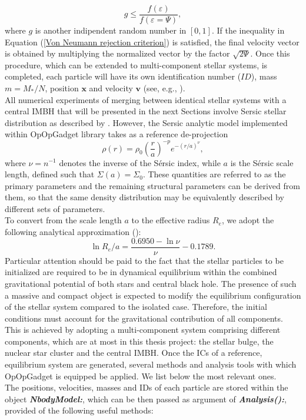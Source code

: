 \documentclass[12pt,twoside,openany]{book}
\begin{document}
\begin{equation}\label{Von Neumann rejection criterion}
 g\le \frac{f(\varepsilon)}{f(\varepsilon=\Psi)},
\end{equation}
where $g$ is another indipendent random number in $[0,1]$. If the inequality in Equation (\ref{Von Neumann rejection criterion}) is satisfied, the final velocity vector is obtained by multiplying the normalized vector by the factor $\sqrt{2\Psi}$. Once this procedure, which can be extended to multi-component stellar systems, is completed, each particle will have its own identification number ($ID$), mass $m=M_*/N$, position $\mathbf{x}$ and velocity $\mathbf{v}$ (see, e.g., \citealt{Aarseth_book}).\\All numerical experiments of merging between identical stellar systems with a central IMBH that will be presented in the next Sections involve Sersic stellar distribution as described by \textcite{Prugniel_1997}. However, the Sersic analytic model implemented within OpOpGadget library takes as a reference \textcite{Neto_1999} de-projection
\begin{equation}\label{Sersic profile Neto}
    \rho(r)=\rho_0\left(\frac{r}{a}\right)^{-p}e^{-(r/a)^\nu},
\end{equation}
where $\nu=n^{-1}$ denotes the inverse of the Sérsic index, while $a$ is the Sérsic scale length, defined such that $\Sigma(a)=\Sigma_0$. These quantities are referred to as the primary parameters and the remaining structural parameters can be derived from them, so that the same density distribution may be equivalently described by different sets of parameters.\\To convert from the scale length $a$ to the effective radius $R_{e}$, we adopt the following analytical approximation (\citealt{Neto_1999}):
\begin{equation}\label{Conversion between a and Reff}
    \ln{R_{e}/a}=\frac{0.6950-\ln{\nu}}{\nu}-0.1789.
\end{equation}
Particular attention should be paid to the fact that the stellar particles to be initialized are required to be in dynamical equilibrium within the combined gravitational potential of both stars and central black hole. The presence of such a massive and compact object is expected to modify the equilibrium configuration of the stellar system compared to the isolated case. Therefore, the initial conditions must account for the gravitational contribution of all components. This is achieved by adopting a multi-component system comprising different components, which are at most in this thesis project: the stellar bulge, the nuclear star cluster and the central IMBH. Once the ICs of a reference, equilibrium system are generated, several methods and analysis tools with which OpOpGadget is equipped be applied. We list below the most relevant ones.\\The positions, velocities, masses and IDs of each particle are stored within the object \textbf{\emph{NbodyModel:}}, which can be then passed as argument of \textbf{\emph{Analysis():}}, provided of the following useful methods:
\end{document}
